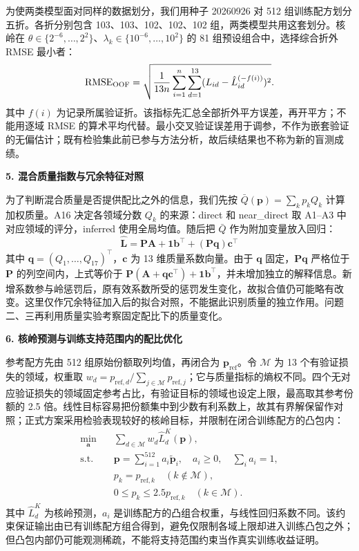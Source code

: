 为使两类模型面对同样的数据划分，我们用种子 20260926 对 512 组训练配方划分五折。各折分别包含 103、103、102、102、102 组，两类模型共用这套划分。核岭在 $\theta\in\{2^{-6},\ldots,2^2\}$、$\lambda_k\in\{10^{-6},\ldots,10^2\}$ 的 81 组预设组合中，选择综合折外 RMSE 最小者：
\begin{equation}
 \mathrm{RMSE}_{\rm OOF}=
 \sqrt{\frac1{13n}\sum_{i=1}^n\sum_{d=1}^{13}
 (L_{id}-\hat L_{id}^{(-f(i))})^2}.
\end{equation}
其中 $f(i)$ 为记录所属验证折。该指标先汇总全部折外平方误差，再开平方；不能用逐域 RMSE 的算术平均代替。最小交叉验证误差用于调参，不作为嵌套验证的无偏估计；既有检验集此前已参与方法分析，故后续结果也不称为新的盲测成绩。

\textbf{5. 混合质量指数与冗余特征对照}\par\nopagebreak[4]

为了判断混合质量是否提供配比之外的信息，我们先按 $\bar Q(\bm p)=\sum_k p_kQ_k$ 计算加权质量。A16 决定各领域分数 $Q_k$ 的来源：direct 和 near\_\allowbreak{}direct 取 A1--A3 中对应领域的评分，inferred 使用全局均值。随后把 $\bar Q$ 作为附加变量放入回归：
\begin{equation}
    \hat{\bm L} = \bm P \bm A + \bm 1 \bm b^{\top} + (\bm P\bm q)\bm c^{\top}
\end{equation}
其中 $\bm q=(Q_1,\ldots,Q_{17})^\top$，$\bm c$ 为 13 维质量系数向量。由于 $\bm q$ 固定，$\bm P\bm q$ 严格位于 $\bm P$ 的列空间内，上式等价于 $\bm P(\bm A+\bm q\bm c^\top)+\bm1\bm b^\top$，并未增加独立的解释信息。新增系数参与岭惩罚后，原有效系数所受的惩罚发生变化，故拟合值仍可能略有改变。这里仅作冗余特征加入后的拟合对照，不能据此识别质量的独立作用。问题二、三再利用质量实验考察固定配比下的质量变化。

\textbf{6. 核岭预测与训练支持范围内的配比优化}\par\nopagebreak[4]

参考配方先由 512 组原始份额取列均值，再闭合为 $\bm p_{\mathrm{ref}}$。令 $\mathcal M$ 为 13 个有验证损失的领域，权重取 $w_d=p_{\mathrm{ref},d}/\sum_{j\in\mathcal M}p_{\mathrm{ref},j}$；它与质量指标的熵权不同。四个无对应验证损失的领域固定参考占比，有验证目标的领域也设定上限，最高取其参考份额的 2.5 倍。线性目标容易把份额集中到少数有利系数上，故其有界解保留作对照；正式方案采用检验表现较好的核岭目标，并限制在闭合训练配方的凸包内：
\begin{equation}
\begin{aligned}
 \min_{\bm a}\quad& \sum_{d\in\mathcal M}w_d\hat L_d^{K}(\bm p),\\
 \mathrm{s.t.}\quad&\bm p=\sum_{i=1}^{512}a_i\tilde{\bm p}_i,
 \quad a_i\ge0,\quad\sum_i a_i=1,\\
 &p_k=p_{\mathrm{ref},k}\quad(k\notin\mathcal M),\\
 &0\le p_k\le2.5p_{\mathrm{ref},k}\quad(k\in\mathcal M).
\end{aligned}
\label{eq:p1_supported_recipe}
\end{equation}
其中 $\hat L_d^{K}$ 为核岭预测，$a_i$ 是训练配方的凸组合权重，与线性回归系数不同。该约束保证输出由已有训练配方组合得到，避免仅限制各域上限却进入训练凸包之外；但凸包内部仍可能观测稀疏，不能将支持范围约束当作真实训练收益证明。

